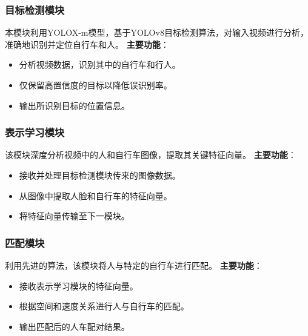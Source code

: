 \documentclass{article}
\begin{document}
\subsubsection{目标检测模块}

本模块利用YOLOX-m模型，基于YOLOv8目标检测算法，对输入视频进行分析，准确地识别并定位自行车和人。
\newline
\newline
\textbf{主要功能}：
\begin{itemize}
    \item 分析视频数据，识别其中的自行车和行人。
    \item 仅保留高置信度的目标以降低误识别率。
    \item 输出所识别目标的位置信息。
\end{itemize}

\subsubsection{表示学习模块}

该模块深度分析视频中的人和自行车图像，提取其关键特征向量。
\newline
\newline
\textbf{主要功能}：
\begin{itemize}
    \item 接收并处理目标检测模块传来的图像数据。
    \item 从图像中提取人脸和自行车的特征向量。
    \item 将特征向量传输至下一模块。
\end{itemize}

\subsubsection{匹配模块}
利用先进的算法，该模块将人与特定的自行车进行匹配。
\newline
\newline
\textbf{主要功能}：
\begin{itemize}
    \item 接收表示学习模块的特征向量。
    \item 根据空间和速度关系进行人与自行车的匹配。
    \item 输出匹配后的人车配对结果。
\end{itemize}
\end{document}
